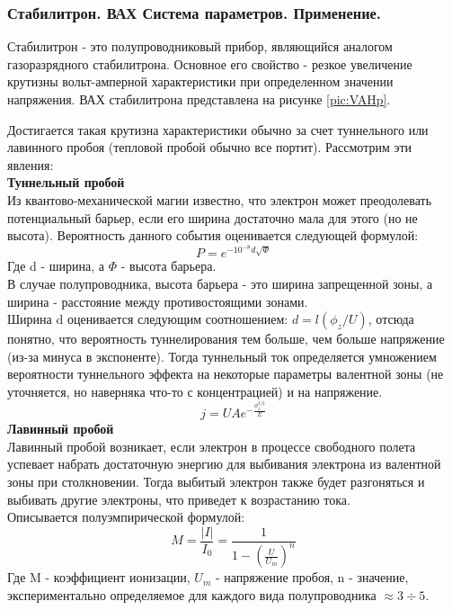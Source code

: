 \subsubsection{Стабилитрон. ВАХ %
 Система параметров. Применение.}


Стабилитрон - это полупроводниковый прибор, являющийся аналогом газоразрядного стабилитрона. Основное его свойство - резкое увеличение крутизны вольт-амперной характеристики при определенном значении напряжения. ВАХ стабилитрона представлена на рисунке \ref{pic:VAHp}.


Достигается такая крутизна характеристики обычно за счет туннельного или лавинного пробоя (тепловой пробой обычно все портит).
Рассмотрим эти явления:\\
\textbf{Туннельный пробой}\\
Из квантово-механической магии известно, что электрон может преодолевать потенциальный барьер, если его ширина достаточно мала для этого (но не высота).
Вероятность данного события оценивается следующей формулой:
\begin{equation}
P = e^{-10^{-8} d \sqrt{\Phi}}
\end{equation}
Где d - ширина, а $\Phi$ - высота барьера.\\

В случае полупроводника, высота барьера - это ширина запрещенной зоны, а ширина - расстояние между противостоящими зонами.\\
Ширина d оценивается следующим соотношением: $d = l (\phi_z/U)$, отсюда понятно, что вероятность туннелирования тем больше, чем больше напряжение (из-за минуса в экспоненте).
Тогда туннельный ток определяется умножением вероятности туннельного эффекта на некоторые параметры валентной зоны (не уточняется, но наверняка что-то с концентрацией) и на напряжение.
\begin{equation}
j = U A e^{-\frac{\phi_z^{3/2}}{E}}
\end{equation} 
\textbf{Лавинный пробой}\\
Лавинный пробой возникает, если электрон в процессе свободного полета успевает набрать достаточную энергию для выбивания электрона из валентной зоны при столкновении. Тогда выбитый электрон также будет разгоняться и выбивать другие электроны, что приведет к возрастанию тока.\\
Описывается полуэмпирической формулой:
\begin{equation}
M = \frac{|I|}{I_0} = \frac{1}{1 - (\frac{U}{U_m})^n}
\end{equation}
Где M - коэффициент ионизации, $U_m$ - напряжение пробоя, n - значение, экспериментально определяемое для каждого вида полупроводника $\approx 3 \div 5$.


